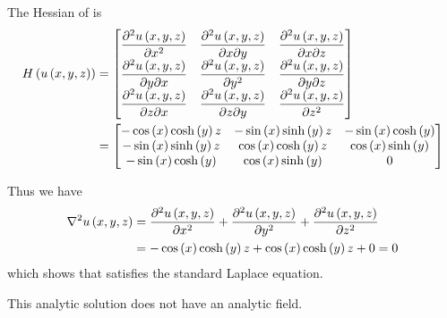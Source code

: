 The Hessian of  is
\begin{equation}
  \begin{aligned}
    \hessian{}{\fnof{u}{x,y,z}}&=\begin{bmatrix}
    \deltwosqby{\fnof{u}{x,y,z}}{x} & \deltwoby{\fnof{u}{x,y,z}}{x}{y} & \deltwoby{\fnof{u}{x,y,z}}{x}{z} \\
    \deltwoby{\fnof{u}{x,y,z}}{y}{x} & \deltwosqby{\fnof{u}{x,y,z}}{y} & \deltwoby{\fnof{u}{x,y,z}}{y}{z} \\
    \deltwoby{\fnof{u}{x,y,z}}{z}{x} & \deltwoby{\fnof{u}{x,y,z}}{z}{y} & \deltwosqby{\fnof{u}{x,y,z}}{z}
    \end{bmatrix}\\
    &=\begin{bmatrix}
    -\cosine{x}\hypecosine{y}z & -\sine{x}\hypesine{y}z & -\sine{x}\hypecosine{y} \\
    -\sine{x}\hypesine{y}z & \cosine{x}\hypecosine{y}z & \cosine{x}\hypesine{y} \\
    -\sine{x}\hypecosine{y} & \cosine{x}\hypesine{y} & 0 \\
    \end{bmatrix}
  \end{aligned}
  \label{eqn:StandardLaplaceThreeDAnalyticHessian2}
\end{equation}

Thus we have
\begin{equation}
  \begin{aligned}
    \laplacian{}{\fnof{u}{x,y,z}}&=\deltwosqby{\fnof{u}{x,y,z}}{x}+\deltwosqby{\fnof{u}{x,y,z}}{y}+\deltwosqby{\fnof{u}{x,y,z}}{z}\\
    &=-\cosine{x}\hypecosine{y}z+\cosine{x}\hypecosine{y}z+0=0
  \end{aligned}
\end{equation}
which shows that  satisfies the standard Laplace equation.

This analytic solution does not have an analytic field.



